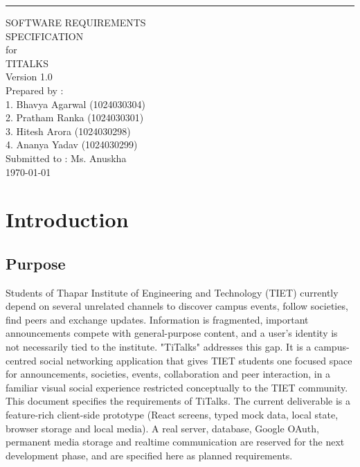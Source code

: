 \documentclass{scrreprt}
\date{}
\def\myversion{1.0 }
\begin{document}
\begin{flushright}
    \rule{16cm}{5pt}\vskip1cm
    \begin{bfseries}
        \Huge{SOFTWARE REQUIREMENTS\\ SPECIFICATION}\\
        \vspace{1.5cm}
        for\\
        \vspace{1.5cm}
        TITALKS\\
        \vspace{1.5cm}
        \LARGE{Version \myversion}\\
        \vspace{1.5cm}
        Prepared by :\\
        1. Bhavya Agarwal (1024030304)\\
        2. Pratham Ranka (1024030301)\\
        3. Hitesh Arora (1024030298)\\
        4. Ananya Yadav (1024030299)\\
        \vspace{1.5cm}
        Submitted to : Ms. Anuskha \\
        \vspace{1.0cm}
        \today\\
    \end{bfseries}
\end{flushright}

\tableofcontents

\chapter{Introduction}

\section{Purpose}
Students of Thapar Institute of Engineering and Technology (TIET) currently depend on several unrelated channels to discover campus events, follow societies, find peers and exchange updates. Information is fragmented, important announcements compete with general-purpose content, and a user's identity is not necessarily tied to the institute. "TiTalks" addresses this gap. It is a campus-centred social networking application that gives TIET students one focused space for announcements, societies, events, collaboration and peer interaction, in a familiar visual social experience restricted conceptually to the TIET community.
\newline
This document specifies the requirements of TiTalks. The current deliverable is a feature-rich client-side prototype (React screens, typed mock data, local state, browser storage and local media). A real server, database, Google OAuth, permanent media storage and realtime communication are reserved for the next development phase, and are specified here as planned requirements.
\end{document}
